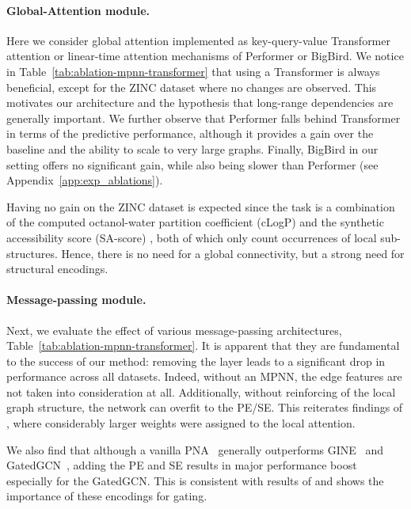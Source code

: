 \documentclass{article}
\begin{document}
\paragraph{Global-Attention module.}
Here we consider global attention implemented as  key-query-value Transformer attention or linear-time attention mechanisms of Performer or BigBird. We notice in Table~\ref{tab:ablation-mpnn-transformer} that using a Transformer is always beneficial, except for the ZINC dataset where no changes are observed. This motivates our architecture and the hypothesis that long-range dependencies are generally important. We further observe that Performer falls behind Transformer in terms of the predictive performance, although it provides a gain over the baseline and the ability to scale to very large graphs. Finally, BigBird in our setting offers no significant gain, while also being slower than Performer (see Appendix~\ref{app:exp_ablations}).

Having no gain on the ZINC dataset is expected since the task is a combination of the computed octanol-water partition coefficient (cLogP) \cite{wildman1999prediction_logp} and the synthetic accessibility score (SA-score) \cite{ertl2009estimation_sascore}, both of which only count occurrences of local sub-structures. Hence, there is no need for a global connectivity, but a strong need for structural encodings.


\paragraph{Message-passing module.} Next, we evaluate the effect of various message-passing architectures, Table~\ref{tab:ablation-mpnn-transformer}. It is apparent that they are fundamental to the success of our method: removing the layer leads to a significant drop in performance across all datasets. Indeed, without an MPNN, the edge features are not taken into consideration at all. Additionally, without reinforcing of the local graph structure, the network can overfit to the PE/SE. This reiterates findings of \citet{kreuzer2021rethinking}, where considerably larger weights were assigned to the local attention.

We also find that although a vanilla PNA~\cite{corso2020principal_pna} generally outperforms GINE~\cite{hu2019strategies_GINE} and GatedGCN~\cite{bresson2017GatedGCN}, adding the PE and SE results in major performance boost especially for the GatedGCN. This is consistent with results of \citet{dwivedi2022LPE} and shows the importance of these encodings for gating.
\end{document}
